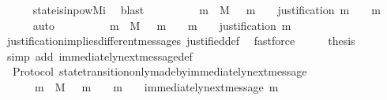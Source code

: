 \begin{isabellebody}
\ \ \ \ \isamarkupfalse%
\ state{\isacharunderscore}is{\isacharunderscore}in{\isacharunderscore}pow{\isacharunderscore}Mi\ \isamarkupfalse%
\ blast\isanewline
\ \ \isamarkupfalse%
\ \isamarkupfalse%
\ {\isachardoublequoteopen}{\isasymforall}\ {\isasymsigma}\ {\isasymin}{\isasymSigma}{\isachardot}\ {\isasymforall}\ m\ {\isasymin}\ M{\isachardot}\ {\isasymsigma}\ {\isasymunion}\ {\isacharbraceleft}m{\isacharbraceright}\ {\isasymin}\ {\isasymSigma}\ {\isasymlongrightarrow}\ justification\ m\ {\isasymsubseteq}\ {\isasymsigma}\ {\isasymunion}\ {\isacharbraceleft}m{\isacharbraceright}{\isachardoublequoteclose}\isanewline
\ \ \ \ \isamarkupfalse%
\ auto\isanewline
\ \ \isamarkupfalse%
\ \isamarkupfalse%
\ {\isachardoublequoteopen}{\isasymforall}\ {\isasymsigma}\ {\isasymin}{\isasymSigma}{\isachardot}\ {\isasymforall}\ m\ {\isasymin}\ M{\isachardot}\ {\isasymsigma}\ {\isasymunion}\ {\isacharbraceleft}m{\isacharbraceright}\ {\isasymin}\ {\isasymSigma}\ {\isasymand}\ m\ {\isasymnotin}\ {\isasymsigma}\ {\isasymlongrightarrow}\ justification\ m\ {\isasymsubseteq}\ {\isasymsigma}{\isachardoublequoteclose}\isanewline
\ \ \ \ \isamarkupfalse%
\ justification{\isacharunderscore}implies{\isacharunderscore}different{\isacharunderscore}messages\ justified{\isacharunderscore}def\ \isamarkupfalse%
\ fastforce\isanewline
\ \ \isamarkupfalse%
\ \isamarkupfalse%
\ {\isacharquery}thesis\isanewline
\ \ \ \ \isamarkupfalse%
\ {\isacharparenleft}simp\ add{\isacharcolon}\ immediately{\isacharunderscore}next{\isacharunderscore}message{\isacharunderscore}def{\isacharparenright}\isanewline
{}\isamarkupfalse%
%
\endisatagproof
{\isafoldproof}%
%
\isadelimproof
\isanewline
%
\endisadelimproof
\isanewline
{}\isamarkupfalse%
\ {\isacharparenleft}\ Protocol{\isacharparenright}\ state{\isacharunderscore}transition{\isacharunderscore}only{\isacharunderscore}made{\isacharunderscore}by{\isacharunderscore}immediately{\isacharunderscore}next{\isacharunderscore}message{\isacharcolon}\ \isanewline
\ \ {\isachardoublequoteopen}{\isasymforall}\ {\isasymsigma}\ {\isasymin}{\isasymSigma}{\isachardot}\ {\isasymforall}\ m\ {\isasymin}\ M{\isachardot}\ {\isasymsigma}\ {\isasymunion}\ {\isacharbraceleft}m{\isacharbraceright}\ {\isasymin}\ {\isasymSigma}\ {\isasymand}\ m\ {\isasymnotin}\ {\isasymsigma}\ {\isasymlongleftrightarrow}\ immediately{\isacharunderscore}next{\isacharunderscore}message\ {\isacharparenleft}{\isasymsigma}{\isacharcomma}m{\isacharparenright}{\isachardoublequoteclose}\isanewline

\end{isabellebody}
